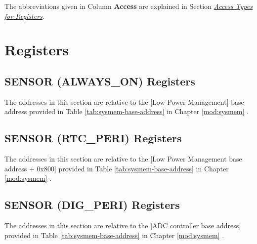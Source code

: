 \documentclass[main\_\_EN.tex]{subfiles}
\begin{document}
The abbreviations given in Column \textbf{Access} are explained in Section \hyperref[glossary-access-types]{\textit{Access Types for Registers}}.




\section{Registers}
\label{section:registers}

\subsection{SENSOR (ALWAYS\_ON) Registers}

The addresses in this section are relative to the [Low Power Management] base address provided in Table \ref{tab:sysmem-base-address} in Chapter \ref{mod:sysmem} \textit{}.



\subsection{SENSOR (RTC\_PERI) Registers}

The addresses in this section are relative to the [Low Power Management base address + 0x{}800] provided in Table \ref{tab:sysmem-base-address} in Chapter \ref{mod:sysmem} \textit{}.



\subsection{SENSOR (DIG\_PERI) Registers}

The addresses in this section are relative to the [ADC controller base address] provided in Table \ref{tab:sysmem-base-address} in Chapter \ref{mod:sysmem} \textit{}.


\end{document}
